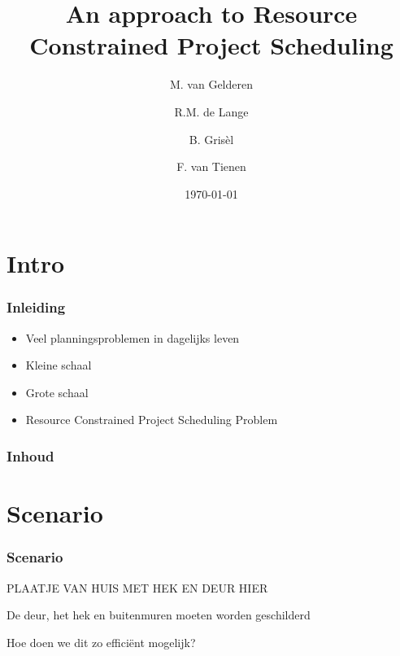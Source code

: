 \documentclass{beamer}
\title[RCPS]{An approach to Resource Constrained Project Scheduling}
\author{M. van Gelderen  \and
    R.M. de Lange \and
    B. Gris\`el \and
    F. van Tienen}
\institute{TU Delft}
\date{\today}
\theoremstyle{definition}
\begin{document}
\begin{frame}
\titlepage
\end{frame}

\section*{Intro}
\begin{frame}
  \frametitle{Inleiding}
  \begin{itemize}
		\item Veel planningsproblemen in dagelijks leven
		\item Kleine schaal
		\item Grote schaal
		\item Resource Constrained Project Scheduling Problem
  \end{itemize}
\end{frame}

\begin{frame}
    \frametitle{Inhoud}
    \tableofcontents
\end{frame}


\section{Scenario}

\begin{frame}
    \frametitle{Scenario}
    PLAATJE VAN HUIS MET HEK EN DEUR HIER
    
    \begin{center}
    	De deur, het hek en buitenmuren moeten worden geschilderd
    \end{center}
\end{frame}

\begin{frame}
    \begin{center}
    	Hoe doen we dit zo effici\"{e}nt mogelijk?
    \end{center}
\end{frame}
\end{document}
